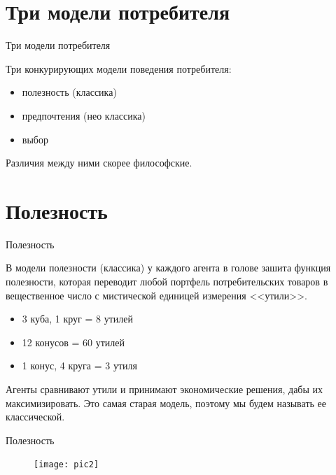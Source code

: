 \documentclass{beamer}
\begin{document}
\section{Три модели потребителя}

\begin{frame}{Три модели потребителя}

Три конкурирующих модели поведения потребителя:

\begin{itemize}
\item полезность (классика)
\item предпочтения (нео классика)
\item выбор
\end{itemize}

Различия между ними скорее философские.

\end{frame}

\section{Полезность}

\begin{frame}{Полезность}

В модели полезности (классика) у каждого агента в голове зашита функция полезности, которая переводит любой \alert{портфель} потребительских товаров в вещественное число с мистической единицей измерения <<\alert{утили}>>.

\begin{itemize}
\item 3 куба, 1 круг = 8 утилей
\item 12 конусов = 60 утилей
\item 1 конус, 4 круга = 3 утиля
\end{itemize}

Агенты сравнивают утили и принимают экономические решения, дабы их максимизировать. Это самая старая модель, поэтому мы будем называть ее \alert{классической}.

\end{frame}

\begin{frame}{Полезность}

\begin{figure}[hbt]
\centering
\texttt{[image: pic2]}
\end{figure}

\end{frame}
\end{document}
